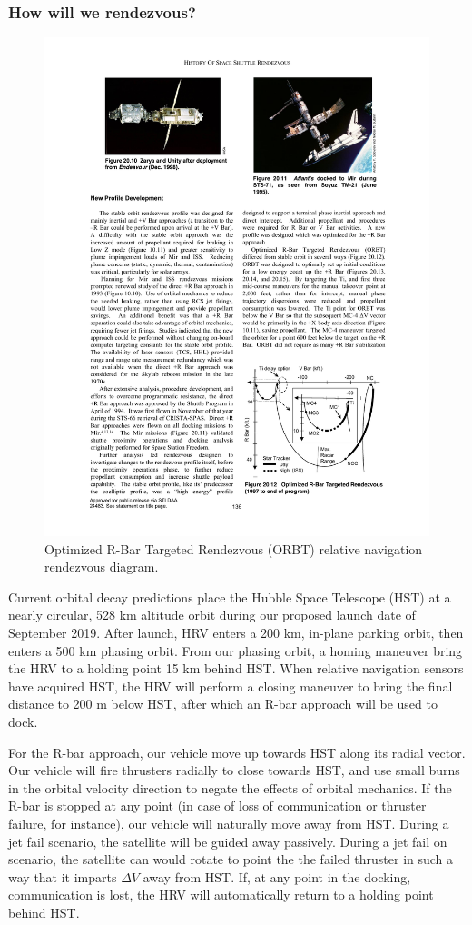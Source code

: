 \documentclass[paper=letter, fontsize=11pt]{scrartcl} %
\numberwithin{equation}{section} %
\numberwithin{figure}{section} %
\numberwithin{table}{section} %
\begin{document}
\subsubsection{How will we rendezvous?}
\begin{figure}[tbh!]
\begin{center}
\includegraphics[width=.75\textwidth]{imgs/orbt.pdf}
\caption{Optimized R-Bar Targeted Rendezvous (ORBT) relative navigation rendezvous diagram.}
\end{center}
\end{figure}

Current orbital decay predictions place the Hubble Space Telescope (HST) at a nearly circular, 528 km altitude orbit during our proposed launch date of September 2019. After launch, HRV enters a 200 km, in-plane parking orbit, then enters a 500 km phasing orbit. From our phasing orbit, a homing maneuver bring the HRV to a holding point 15 km behind HST. When relative navigation sensors have acquired HST, the HRV will perform a closing maneuver to bring the final distance to 200 m below HST, after which an R-bar approach will be used to dock.

For the R-bar approach, our vehicle move up towards HST along its radial vector. Our vehicle will fire thrusters radially to close towards HST, and use small burns in the orbital velocity direction to negate the effects of orbital mechanics. If the R-bar is stopped at any point (in case of loss of communication or thruster failure, for instance), our vehicle will naturally move away from HST. During a jet fail scenario, the satellite will be guided away passively. During a jet fail on scenario, the satellite can would rotate to point the the failed thruster in such a way that it imparts $\Delta V$ away from HST. If, at any point in the docking, communication is lost, the HRV will automatically return to a holding point behind HST.
\end{document}
